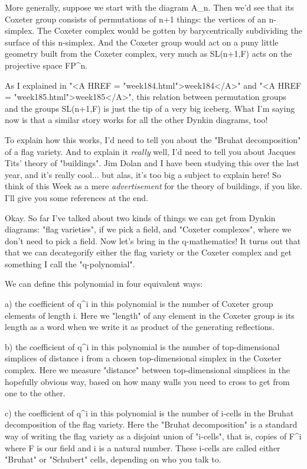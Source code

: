 More generally, suppose we start with the diagram A_{n}.  Then
we'd see that its Coxeter group consists of permutations of n+1 things:
the vertices of an n-simplex.  The Coxeter complex would be gotten by
barycentrically subdividing the surface of this n-simplex.  And the
Coxeter group would act on a puny little geometry built from the Coxeter
complex, very much as SL(n+1,F) acts on the projective space
FP^{n}.

As I explained in "<A HREF = "week184.html">week184</A>" and "<A HREF = "week185.html">week185</A>", this relation between 
permutation groups and the groups SL(n+1,F) is just the tip of a 
very big iceberg.  What I'm saying now is that a similar story works 
for all the other Dynkin diagrams, too!  

To explain how this works, I'd need to tell you about the "Bruhat
decomposition" of a flag variety.  And to explain it \emph{really} well, 
I'd need to tell you about Jacques Tits' theory of "buildings".  Jim 
Dolan and I have been studying this over the last year, and it's really 
cool... but alas, it's too big a subject to explain here!  So think of 
this Week as a mere \emph{advertisement} for the theory of buildings, if you 
like.  I'll give you some references at the end.

Okay.  So far I've talked about two kinds of things we can get from
Dynkin diagrams: "flag varieties", if we pick a field, and "Coxeter
complexes", where we don't need to pick a field.  Now let's bring
in the q-mathematics!  It turns out that that we can decategorify 
either the flag variety or the Coxeter complex and get something
I call the "q-polynomial".  

We can define this polynomial in four equivalent ways:

a) the coefficient of q^{i} in this polynomial is the number of
Coxeter group elements of length i.  Here we "length" of any 
element in the Coxeter group is its length as a word when we 
write it as product of the generating reflections.

b) the coefficient of q^{i} in this polynomial is the number of
top-dimensional simplices of distance i from a chosen top-dimensional
simplex in the Coxeter complex.  Here we measure "distance" between
top-dimensional simplices in the hopefully obvious way, based on how 
many walls you need to cross to get from one to the other.

c) the coefficient of q^{i} in this polynomial is the number of
i-cells in the Bruhat decomposition of the flag variety.  Here the
"Bruhat decomposition" is a standard way of writing the flag
variety as a disjoint union of "i-cells", that is, copies of
F^{i} where F is our field and i is a natural number.  These
i-cells are called either "Bruhat" or "Schubert"
cells, depending on who you talk to.

